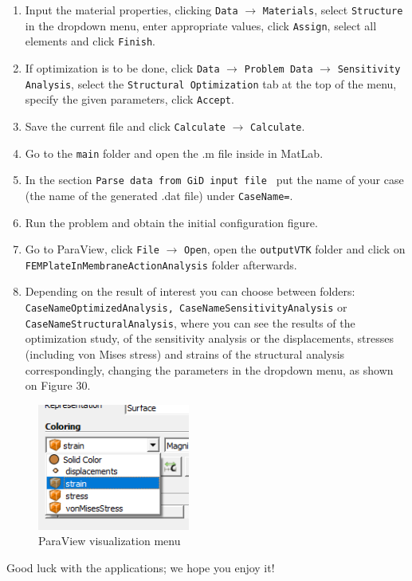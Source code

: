 \begin{enumerate}
\item Input the material properties, clicking \texttt{Data} $\rightarrow$ \texttt{Materials}, select \texttt{Structure} in the dropdown menu, enter appropriate values, click \texttt{Assign}, select all elements and click \texttt{Finish}.
\item If optimization is to be done, click \texttt{Data} $\rightarrow$ \texttt{Problem Data} $\rightarrow$ \texttt{Sensitivity Analysis}, select the \texttt{Structural Optimization} tab at the top of the menu, specify the given parameters, click \texttt{Accept}.
\item Save the current file and click \texttt{Calculate} $\rightarrow$ \texttt{Calculate}.
\item Go to the \texttt{main} folder and open the .m file inside in MatLab.
\item  In the section \texttt{Parse data from GiD input file } put the name of your case (the name of the generated .dat file) under \texttt{CaseName=}.
\item Run the problem and obtain the initial configuration figure.
\item Go to ParaView, click \texttt{File} $\rightarrow$ \texttt{Open}, open the \texttt{outputVTK} folder and click on \texttt{FEMPlateInMembraneActionAnalysis} folder afterwards.  
\item Depending on the result of interest you can choose between folders: \texttt{CaseName\textunderscore Optimized\textunderscore Analysis, \newline CaseName\textunderscore Sensitivity\textunderscore Analysis} or \texttt{CaseName\textunderscore Structural\textunderscore Analysis}, where you can see the results of the optimization study, of the sensitivity analysis or the displacements, stresses (including von Mises stress) and strains of the structural analysis correspondingly, changing the parameters in the dropdown menu, as shown on Figure 30.
\end{enumerate}
  \begin{figure}[ht]
  \centering
  \includegraphics[width=50mm]{images/Paraview.png}
  \caption{ParaView visualization menu}
  \label{fig:Paraview visualization}
\end{figure}
Good luck with the applications; we hope you enjoy it!